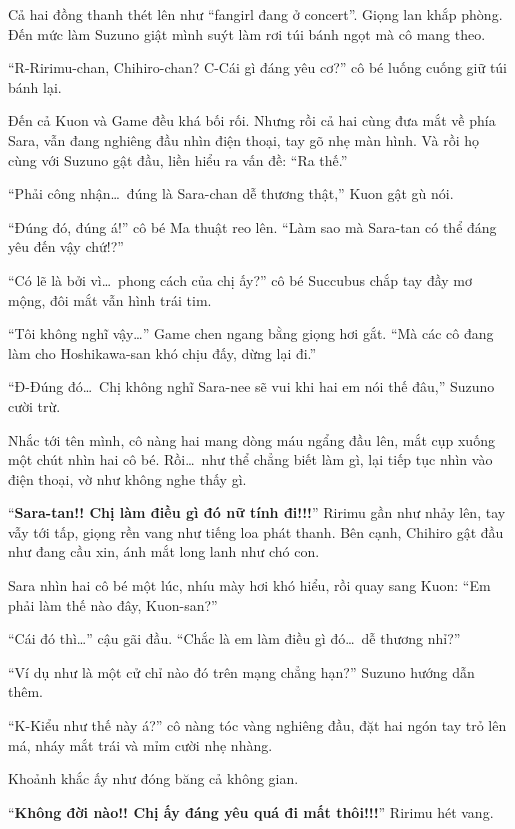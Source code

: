 \documentclass[../main.tex]{subfiles}
\begin{document}
Cả hai đồng thanh thét lên như ``fangirl đang ở concert''. Giọng lan khắp phòng. Đến mức làm Suzuno giật mình suýt làm rơi túi bánh ngọt mà cô mang theo.

``R-Ririmu-chan, Chihiro-chan? C-Cái gì đáng yêu cơ?'' cô bé luống cuống giữ túi bánh lại.

Đến cả Kuon và Game đều khá bối rối. Nhưng rồi cả hai cùng đưa mắt về phía Sara, vẫn đang nghiêng đầu nhìn điện thoại, tay gõ nhẹ màn hình. Và rồi họ cùng với Suzuno gật đầu, liền hiểu ra vấn đề: ``Ra thế.''

``Phải công nhận\dots\ đúng là Sara-chan dễ thương thật,'' Kuon gật gù nói.

``Đúng đó, đúng á!'' cô bé Ma thuật reo lên. ``Làm sao mà Sara-tan có thể đáng yêu đến vậy chứ!?''

``Có lẽ là bởi vì\dots\ phong cách của chị ấy?'' cô bé Succubus chắp tay đầy mơ mộng, đôi mắt vẫn hình trái tim.


``Tôi không nghĩ vậy\dots'' Game chen ngang bằng giọng hơi gắt. ``Mà các cô đang làm cho Hoshikawa-san khó chịu đấy, dừng lại đi.''

``Đ-Đúng đó\dots\ Chị không nghĩ Sara-nee sẽ vui khi hai em nói thế đâu,'' Suzuno cười trừ.

Nhắc tới tên mình, cô nàng hai mang dòng máu ngẩng đầu lên, mắt cụp xuống một chút nhìn hai cô bé. Rồi\dots\ như thể chẳng biết làm gì, lại tiếp tục nhìn vào điện thoại, vờ như không nghe thấy gì.

``\textbf{Sara-tan!! Chị làm điều gì đó nữ tính đi!!!}'' Ririmu gần như nhảy lên, tay vẫy tới tấp, giọng rền vang như tiếng loa phát thanh. Bên cạnh, Chihiro gật đầu như đang cầu xin, ánh mắt long lanh như chó con.

Sara nhìn hai cô bé một lúc, nhíu mày hơi khó hiểu, rồi quay sang Kuon: ``Em phải làm thế nào đây, Kuon-san?''

``Cái đó thì\dots'' cậu gãi đầu. ``Chắc là em làm điều gì đó\dots\ dễ thương nhỉ?''

``Ví dụ như là một cử chỉ nào đó trên mạng chẳng hạn?'' Suzuno hướng dẫn thêm.

``K-Kiểu như thế này á?'' cô nàng tóc vàng nghiêng đầu, đặt hai ngón tay trỏ lên má, nháy mắt trái và mỉm cười nhẹ nhàng.


Khoảnh khắc ấy như đóng băng cả không gian.

``\textbf{Không đời nào!! Chị ấy đáng yêu quá đi mất thôi!!!}'' Ririmu hét vang.
\end{document}
